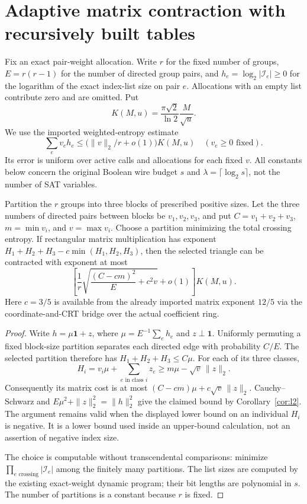 \section{Adaptive matrix contraction with recursively built tables}
\label{cached:section}

Fix an exact pair-weight allocation. Write $r$ for the fixed number of groups,
$E=r(r-1)$ for the number of directed group pairs, and
$h_e=\log_2|\mathcal I_e|\ge0$ for the logarithm of the exact index-list size
on pair $e$. Allocations with an empty list contribute zero and are omitted.
Put
\[
 K(M,u)=\frac{\pi\sqrt2}{\ln2}\frac M{\sqrt u}.
\]
We use the imported weighted-entropy estimate
\[
 \sum_e v_eh_e\le \bigl(\|v\|_2/r+o(1)\bigr)K(M,u)
 \quad(v_e\ge0\text{ fixed}).
\]
Its error is uniform over active calls and allocations for each fixed $v$.
All constants below concern the original Boolean wire budget $s$ and
$\lambda=\lceil\log_2s\rceil$, not the number of SAT variables.

\begin{lemma}\label{cached:triangle}
Partition the $r$ groups into three blocks of prescribed positive sizes.
Let the three numbers of directed pairs between blocks be $v_1,v_2,v_3$,
and put $C=v_1+v_2+v_3$, $m=\min v_i$, and $v=\max v_i$.
Choose a partition minimizing the total crossing entropy. If rectangular
matrix multiplication has exponent
$H_1+H_2+H_3-c\min(H_1,H_2,H_3)$, then the selected triangle can be
contracted with exponent at most
\[
 \left[\frac1r\sqrt{\frac{(C-cm)^2}{E}+c^2v}+o(1)\right]K(M,u).
\]
Here $c=3/5$ is available from the already imported matrix exponent $12/5$
via the coordinate-and-CRT bridge over the actual coefficient ring.
\end{lemma}
\begin{proof}
Write $h=\mu\mathbf1+z$, where
$\mu=E^{-1}\sum_eh_e$ and $z\perp\mathbf1$. Uniformly permuting a fixed
block-size partition separates each directed edge with probability $C/E$.
The selected partition therefore has $H_1+H_2+H_3\le C\mu$.
For each of its three classes,
\[
 H_i=v_i\mu+\sum_{e\text{ in class }i}z_e
 \ge m\mu-\sqrt v\,\|z\|_2.
\]
Consequently its matrix cost is at most
$(C-cm)\mu+c\sqrt v\,\|z\|_2$.
Cauchy--Schwarz and
$E\mu^2+\|z\|_2^2=\|h\|_2^2$ give the claimed bound by
Corollary~\ref{cor:l2}. The argument remains valid when the displayed
lower bound on an individual $H_i$ is negative. It is a lower bound used
inside an upper-bound calculation, not an assertion of negative index size.

The choice is computable without transcendental comparisons: minimize
$\prod_{e\text{ crossing}}|\mathcal I_e|$ among the finitely many partitions.
The list sizes are computed by the existing exact-weight dynamic program;
their bit lengths are polynomial in $s$. The number of partitions is a
constant because $r$ is fixed.
\end{proof}


